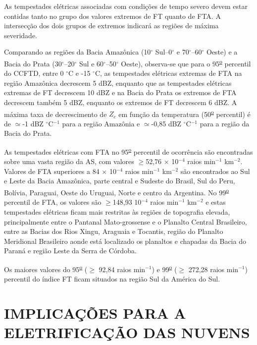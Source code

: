 As tempestades elétricas associadas com condições de tempo severo devem estar contidas tanto no grupo dos valores extremos de FT quanto de FTA. A intersecção dos dois grupos de extremos indicará as regiões de máxima severidade. %

Comparando as regiões da Bacia Amazônica (10$^{\circ}$ Sul--0$^{\circ}$ e 70$^{\circ}$--60$^{\circ}$ Oeste) e a Bacia do Prata (30$^{\circ}$--20$^{\circ}$ Sul e 60$^{\circ}$--50$^{\circ}$ Oeste), observa-se que para o 95\textsuperscript{\underline{o}} percentil do CCFTD, entre 0 $^{\circ}$C e -15 $^{\circ}$C, as tempestades elétricas extremas de FTA na região Amazônica decrescem 5 dBZ, enquanto que as tempestades elétricas extremas de FT decrescem 10 dBZ e na Bacia do Prata os extremos de FTA decrescem também 5 dBZ, enquanto os extremos de FT decrescem  6 dBZ. A máxima taxa de decrescimento de $Z_c$ em função da temperatura (50\textsuperscript{\underline{o}} percentil) é de $\simeq$-1 dBZ $^{\circ}$C$^{-1}$ para a região Amazônia e $\simeq$-0,85 dBZ $^{\circ}$C$^{-1}$ para a região da Bacia do Prata.

As tempestades elétricas com FTA no 95\textsuperscript{\underline{o}} percentil de ocorrência são encontradas sobre uma vasta região da AS, com valores $\geq$52,76 $\times$ 10$^{-4}$ raios min$^{-1}$ km$^{-2}$. Valores de FTA superiores a 84 $\times$ 10$^{-4}$ raios min$^{-1}$ km$^{-2}$ são encontrados ao Sul e Leste da Bacia Amazônica, parte central e Sudeste do Brasil, Sul do Peru, Bolívia, Paraguai, Oeste do Uruguai, Norte e centro da Argentina. No 99\textsuperscript{\underline{o}} percentil de FTA, os valores são $\geq$148,93 10$^{-4}$ raios min$^{-1}$ km$^{-2}$ e estas tempestades elétricas ficam mais restritas às regiões de topografia elevada, principalmente entre o Pantanal Mato-grossense e o Planalto Central Brasileiro, entre as Bacias dos Rios Xingu, Araguaia e Tocantis, região do Planalto Meridional Brasileiro aonde está localizado os planaltos e chapadas da Bacia do Paraná e região Leste da Serra de Córdoba.

Os maiores valores do 95\textsuperscript{\underline{o}} ($\geq$ 92,84 raios min$^{-1}$) e 99\textsuperscript{\underline{o}} ($\geq$ 272,28 raios min$^{-1}$) percentil do índice FT ficam situados na região Sul da América do Sul.




\section{IMPLICAÇÕES PARA A ELETRIFICAÇÃO DAS NUVENS}

